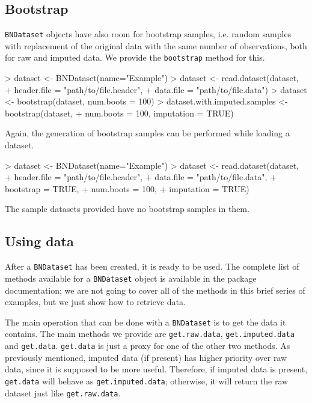 \documentclass{article}
\newcommand{\Robject}[1]{{\texttt{#1}}}
\newcommand{\Rmethod}[1]{{\texttt{#1}}}
\begin{document}
\subsection{Bootstrap}
\Robject{BNDataset} objects have also room for bootstrap samples, i.e. random samples with replacement of the original data with the same number of observations, both for raw and imputed data.
We provide the \Rmethod{bootstrap} method for this.
\begin{Schunk}
\begin{Sinput}
> dataset <- BNDataset(name="Example")
> dataset <- read.dataset(dataset,
+                         header.file = "path/to/file.header",
+                         data.file   = "path/to/file.data")
> dataset <- bootstrap(dataset, num.boots = 100)
> dataset.with.imputed.samples <- bootstrap(dataset,
+                             num.boots = 100, imputation = TRUE)
\end{Sinput}
\end{Schunk}

Again, the generation of bootstrap samples can be performed while loading a dataset.
\begin{Schunk}
\begin{Sinput}
> dataset <- BNDataset(name="Example")
> dataset <- read.dataset(dataset,
+                         header.file = "path/to/file.header",
+                         data.file   = "path/to/file.data",
+                         bootstrap   = TRUE,
+                         num.boots   = 100,
+                         imputation  = TRUE)
\end{Sinput}
\end{Schunk}

The sample datasets provided have no bootstrap samples in them.

\subsection{Using data}
\label{sec:usingdata}
After a \Robject{BNDataset} has been created, it is ready to be used.
The complete list of methods available for a \Robject{BNDataset} object is available
in the package documentation; we are not going to cover all of the methods in this brief series
of examples, but we just show how to retrieve data.

The main operation that can be done with a \Robject{BNDataset} is to get the data it contains.
The main methods we provide are \Rmethod{get.raw.data}, \Rmethod{get.imputed.data} and \Rmethod{get.data}. \Rmethod{get.data} is just a proxy
for one of the other two methods.
As previously mentioned, imputed data (if present) has higher priority over raw data, since it is supposed to be more useful.
Therefore, if imputed data is present, \Rmethod{get.data} will behave as \Rmethod{get.imputed.data}; otherwise,
it will return the raw dataset just like \Rmethod{get.raw.data}.
\end{document}
